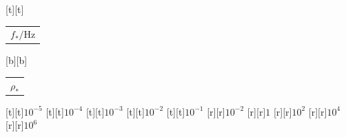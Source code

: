 %    
%
%
\begin{psfrags}%
\psfragscanon%
%
[t][t]{\color[rgb]{0,0,0}\setlength{\tabcolsep}{0pt}\begin{tabular}{c}{\Large$f_\ast/\mathrm{Hz}$}\end{tabular}}%
[b][b]{\color[rgb]{0,0,0}\setlength{\tabcolsep}{0pt}\begin{tabular}{c}{\Large$\rho_\ast$}\end{tabular}}%
%
[t][t]{$10^{-5}$}%
[t][t]{$10^{-4}$}%
[t][t]{$10^{-3}$}%
[t][t]{$10^{-2}$}%
[t][t]{$10^{-1}$}%
%
[r][r]{$10^{-2}$}%
[r][r]{$1$}%
[r][r]{$10^{2}$}%
[r][r]{$10^{4}$}%
[r][r]{$10^{6}$}%
%
%
\end{psfrags}%
%
